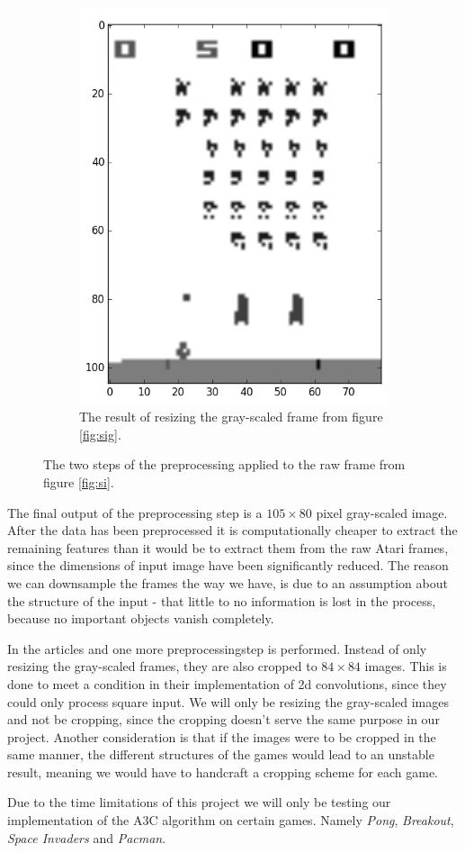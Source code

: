 \documentclass[11pt]{article}
\begin{document}
\begin{figure}[h!]
\begin{subfigure}[t]{.5\textwidth}
        \includegraphics[scale=0.35]{include/space_invaders_1_gray_resized.png}
        \caption{The result of resizing the gray-scaled frame from figure \ref{fig:sig}.}
        \label{fig:scanlike}
    \end{subfigure}
    \caption{The two steps of the preprocessing applied to the raw frame from figure \ref{fig:si}.}
\end{figure}


The final output of the preprocessing step is a $105 \times 80$ pixel gray-scaled
image.
After the data has been preprocessed it is computationally cheaper to extract the remaining
features than it would be to extract them from the raw Atari frames,
since the dimensions of input image have been significantly reduced.
The reason we can downsample the frames the way we have,
is due to an assumption about the structure of the input - that
little to no information is lost in the process, because no important objects vanish completely.

In the articles \cite{a3c} and \cite{dqn} one more preprocessingstep is performed.
Instead of only resizing the gray-scaled frames, they are also cropped to $84 \times 84$ images.
This is done to meet a condition in their implementation of 2d convolutions,
since they could only process square input\cite{dqn-nature}.
We will only be resizing the gray-scaled images and not be cropping,
since the cropping doesn't serve the same purpose in our project.
Another consideration is that if the images were to be cropped in the same manner,
the different structures of the games would lead to an unstable
result, meaning we would have to handcraft a cropping scheme for each game.

Due to the time limitations of this project we will only be testing our
implementation of the A3C algorithm on certain games.
Namely \textit{Pong}, \textit{Breakout}, \textit{Space Invaders} and
\textit{Pacman}.
\end{document}
